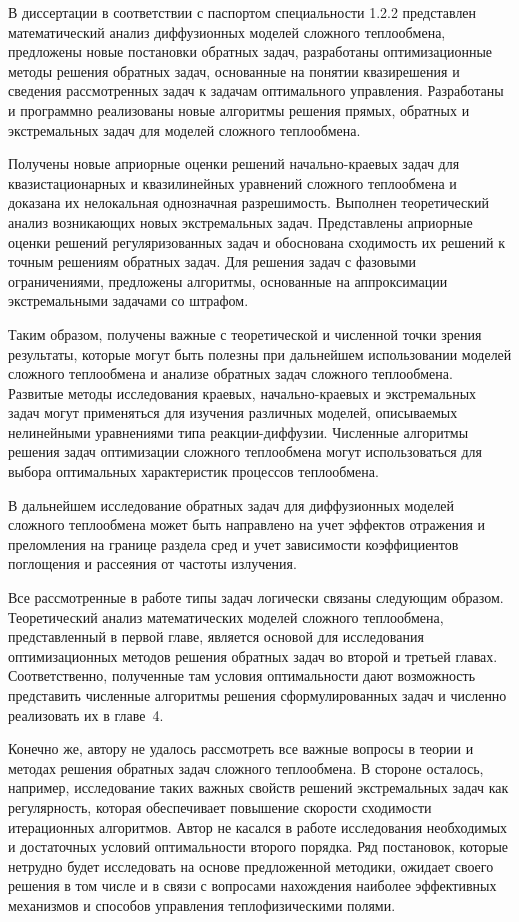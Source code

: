 В диссертации в соответствии с паспортом специальности 1.2.2 представлен
математический анализ диффузионных моделей сложного теплообмена,
предложены новые постановки обратных задач, разработаны
оптимизационные методы решения обратных задач, основанные на понятии
квазирешения и сведения рассмотренных задач к задачам оптимального
управления.
Разработаны и программно реализованы новые алгоритмы
решения прямых, обратных и экстремальных задач для моделей сложного
теплообмена.


Получены новые априорные оценки решений начально-краевых задач для
квазистационарных и квазилинейных уравнений сложного теплообмена и
доказана их нелокальная однозначная разрешимость.
Выполнен теоретический анализ возникающих новых экстремальных задач.
Представлены априорные оценки решений регуляризованных задач и
обоснована сходимость их решений к точным решениям обратных задач.
Для решения задач с фазовыми ограничениями, предложены алгоритмы,
основанные на аппроксимации экстремальными задачами со штрафом.


Таким образом, получены важные с теоретической и численной точки зрения
результаты, которые могут быть полезны при дальнейшем использовании
моделей сложного теплообмена и анализе обратных задач сложного
теплообмена.
Развитые методы исследования краевых, начально-краевых и
экстремальных задач могут применяться для изучения различных моделей,
описываемых нелинейными уравнениями типа реакции-диффузии.
Численные алгоритмы решения задач оптимизации сложного теплообмена
могут использоваться для выбора оптимальных характеристик процессов
теплообмена.

В дальнейшем исследование обратных задач для диффузионных моделей
сложного теплообмена может быть направлено на учет эффектов отражения
и преломления на границе раздела сред и учет зависимости коэффициентов
поглощения и рассеяния от частоты излучения.

Все рассмотренные в работе типы задач логически связаны следующим образом.
Теоретический анализ математических моделей сложного
теплообмена, представленный в первой главе, является основой для
исследования оптимизационных методов решения обратных задач во второй
и третьей главах.
Соответственно, полученные там условия оптимальности
дают возможность представить численные алгоритмы решения
сформулированных задач и численно реализовать их в главе~4.


Конечно же, автору не удалось рассмотреть все важные вопросы в теории и
методах решения обратных задач сложного теплообмена.
В стороне осталось, например, исследование таких важных свойств решений экстремальных
задач как регулярность, которая обеспечивает повышение скорости
сходимости итерационных алгоритмов.
Автор не касался в работе исследования необходимых и достаточных условий
оптимальности второго порядка.
Ряд постановок, которые нетрудно будет исследовать на основе
предложенной методики, ожидает своего решения в том числе и в связи с
вопросами нахождения наиболее эффективных механизмов и способов
управления теплофизическими полями.
